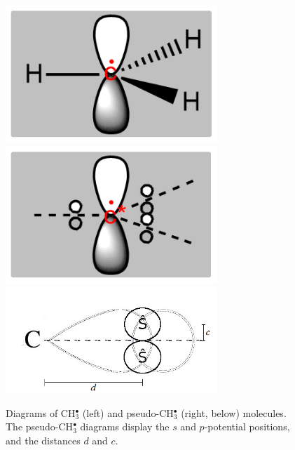 \documentclass[12pt]{article}
\begin{document}
\begin{figure}
\begin{center}
\includegraphics[width=8cm]{ch3.png}
\includegraphics[width=8cm]{pseudoch3.png}
\includegraphics[width=8cm]{tm_sp2_potentials.png}
\end{center}
\vspace{0.25in}
\hspace*{3in}
\caption{Diagrams of CH\(^{\bullet}_{3}\) (left) and pseudo-CH\(^{\bullet}_{3}\) (right, below) molecules. The pseudo-CH\(^{\bullet}_{3}\) diagrams display the \(s\) and \(p\)-potential positions, and the distances \(d\) and \(c\).}
\label{figure:ref_pseudo_diagram}
\end{figure}
\end{document}

